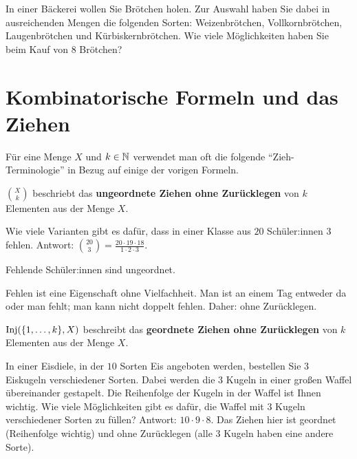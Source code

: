 \begin{aufg}
	In einer Bäckerei wollen Sie Brötchen holen. Zur Auswahl haben Sie dabei in ausreichenden Mengen die folgenden Sorten: Weizenbrötchen, Vollkornbrötchen, Laugenbrötchen und Kürbiskern\-brötchen. Wie viele Möglichkeiten haben Sie beim Kauf von $8$ Brötchen? 
\end{aufg} 

\section{Kombinatorische Formeln und das Ziehen}

\begin{bem}
	Für eine Menge $X$ und $k \in \mathbb{N}$ verwendet man oft die folgende ``Zieh-Terminologie'' in Bezug auf einige der vorigen Formeln. 
\end{bem}

\begin{bem} $\binom{X}{k}$ beschriebt das \textbf{ungeordnete Ziehen ohne Zurücklegen} von $k$ Elementen aus der Menge $X$.  
\end{bem}

\begin{bsp}
Wie viele Varianten gibt es dafür, dass in einer Klasse aus $20$ Schüler:innen $3$ fehlen. Antwort: $\binom{20}{3} = \frac{20 \cdot 19 \cdot 18}{1 \cdot 2 \cdot 3}$.

Fehlende Schüler:innen sind ungeordnet. 

Fehlen ist eine Eigenschaft ohne Vielfachheit. Man ist an einem Tag entweder da oder man fehlt; man kann  nicht doppelt fehlen. Daher: ohne Zurücklegen. 
\end{bsp} 

\begin{bem} $\operatorname{Inj}(\{1,\ldots,k\},X)$ beschreibt das \textbf{geordnete Ziehen ohne Zurücklegen} von $k$ Elementen aus der Menge $X$. 
\end{bem}

\begin{bsp}
In einer Eisdiele, in der $10$ Sorten Eis angeboten werden, bestellen Sie $3$ Eiskugeln verschiedener Sorten. Dabei werden die $3$ Kugeln in einer großen Waffel übereinander gestapelt. Die Reihenfolge der Kugeln in der Waffel ist Ihnen wichtig. Wie viele Möglichkeiten gibt es dafür, die Waffel mit $3$ Kugeln verschiedener Sorten zu füllen? Antwort: $10 \cdot 9 \cdot 8$. Das Ziehen hier ist geordnet (Reihenfolge wichtig) und ohne Zurücklegen (alle $3$ Kugeln haben eine andere Sorte). 
\end{bsp} 

